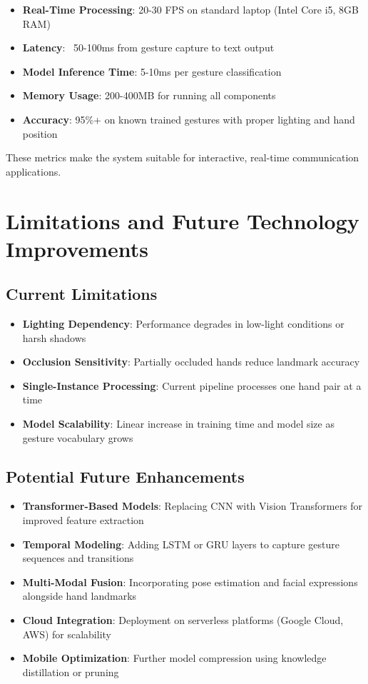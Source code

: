 \begin{itemize}
    \item \textbf{Real-Time Processing}: 20-30 FPS on standard laptop (Intel Core i5, 8GB RAM)
    \item \textbf{Latency}: ~50-100ms from gesture capture to text output
    \item \textbf{Model Inference Time}: 5-10ms per gesture classification
    \item \textbf{Memory Usage}: 200-400MB for running all components
    \item \textbf{Accuracy}: 95\%+ on known trained gestures with proper lighting and hand position
\end{itemize}

These metrics make the system suitable for interactive, real-time communication applications.

\section{Limitations and Future Technology Improvements}

\subsection{Current Limitations}

\begin{itemize}
    \item \textbf{Lighting Dependency}: Performance degrades in low-light conditions or harsh shadows
    \item \textbf{Occlusion Sensitivity}: Partially occluded hands reduce landmark accuracy
    \item \textbf{Single-Instance Processing}: Current pipeline processes one hand pair at a time
    \item \textbf{Model Scalability}: Linear increase in training time and model size as gesture vocabulary grows
\end{itemize}

\subsection{Potential Future Enhancements}

\begin{itemize}
    \item \textbf{Transformer-Based Models}: Replacing CNN with Vision Transformers for improved feature extraction
    \item \textbf{Temporal Modeling}: Adding LSTM or GRU layers to capture gesture sequences and transitions
    \item \textbf{Multi-Modal Fusion}: Incorporating pose estimation and facial expressions alongside hand landmarks
    \item \textbf{Cloud Integration}: Deployment on serverless platforms (Google Cloud, AWS) for scalability
    \item \textbf{Mobile Optimization}: Further model compression using knowledge distillation or pruning
\end{itemize}
